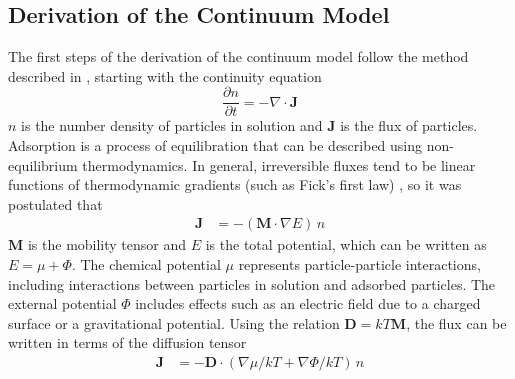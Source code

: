 \subsection{Derivation of the Continuum Model }

The first steps of the derivation of the continuum model follow the
method described in \cite{Adamczyk1999a,Adamczyk2000,Adamczyk1999},
starting with the continuity equation\begin{equation}
\frac{\partial n}{\partial t}=-\nabla\cdot\mathbf{J}\label{eq:Continuity}\end{equation}
$n$ is the number density of particles in solution and $\mathbf{J}$
is the flux of particles. Adsorption is a process of equilibration
that can be described using non-equilibrium thermodynamics. In general,
irreversible fluxes tend to be linear functions of thermodynamic gradients
(such as Fick's first law) \cite{degroot1984non}, so it was postulated
that \begin{align}
\mathbf{J} & =-\left(\mathbf{M}\cdot\nabla E\right)\, n\label{eq:Flux ito Mobility}\end{align}
$\mathbf{M}$ is the mobility tensor and $E$ is the total potential,
which can be written as $E=\mu+\Phi$. The chemical potential $\mu$
represents particle-particle interactions, including interactions
between particles in solution and adsorbed particles. The external
potential $\Phi$ includes effects such as an electric field due to
a charged surface or a gravitational potential. Using the relation
$\mathbf{D}=kT\mathbf{M}$, the flux can be written in terms of the
diffusion tensor\begin{align}
\mathbf{J} & =-\mathbf{D}\cdot\left(\nabla\mu/kT+\nabla\Phi/kT\right)\, n\label{eq:Flux ito Diffusion}\end{align}


